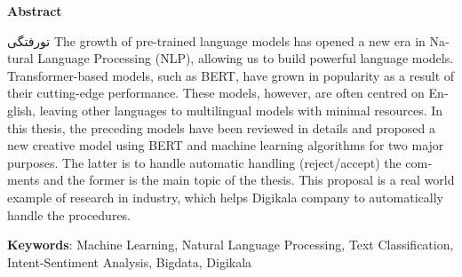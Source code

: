 


\pagestyle{empty}

\begin{latin}

\begin{center}
\textbf{Abstract}
\end{center}
{}‌تورفتگی
The growth of pre-trained language models has opened a new era in Natural Language Processing (NLP), allowing us to build powerful language models. Transformer-based models, such as BERT, have grown in popularity as a result of their cutting-edge performance. These models, however, are often centred on English, leaving other languages to multilingual models with minimal resources. 
In this thesis, the preceding models have been reviewed in details and proposed a new creative model using BERT and machine learning algorithms for two major purposes. The latter is to handle automatic handling (reject/accept) the comments and the former is the main topic of the thesis. This proposal is a real world example of research in industry, which helps Digikala company to automatically handle the procedures.

\bigskip\noindent\textbf{Keywords}:
Machine Learning, Natural Language Processing, Text Classification, Intent-Sentiment Analysis, Bigdata, Digikala

\end{latin}

\newpage
